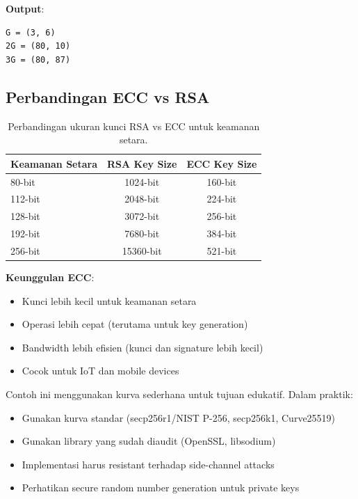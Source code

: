 \textbf{Output}:
\begin{verbatim}
G = (3, 6)
2G = (80, 10)
3G = (80, 87)
\end{verbatim}

\subsection{Perbandingan ECC vs RSA}

\begin{table}[htbp]
  \centering
  \small
  \begin{tabular}{lcc}
    \toprule
    \textbf{Keamanan Setara} & \textbf{RSA Key Size} & \textbf{ECC Key Size} \\
    \midrule
    80-bit & 1024-bit & 160-bit \\
    112-bit & 2048-bit & 224-bit \\
    128-bit & 3072-bit & 256-bit \\
    192-bit & 7680-bit & 384-bit \\
    256-bit & 15360-bit & 521-bit \\
    \bottomrule
  \end{tabular}
  \caption{Perbandingan ukuran kunci RSA vs ECC untuk keamanan setara.}
\end{table}

\textbf{Keunggulan ECC}:
\begin{itemize}
  \item Kunci lebih kecil untuk keamanan setara
  \item Operasi lebih cepat (terutama untuk key generation)
  \item Bandwidth lebih efisien (kunci dan signature lebih kecil)
  \item Cocok untuk IoT dan mobile devices
\end{itemize}

\begin{catatan}
Contoh ini menggunakan kurva sederhana untuk tujuan edukatif. Dalam praktik:
\begin{itemize}
  \item Gunakan kurva standar (secp256r1/NIST P-256, secp256k1, Curve25519)
  \item Gunakan library yang sudah diaudit (OpenSSL, libsodium)
  \item Implementasi harus resistant terhadap side-channel attacks
  \item Perhatikan secure random number generation untuk private keys
\end{itemize}
\end{catatan}


